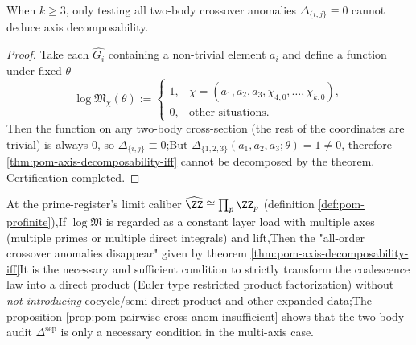\begin{proposition}\label{prop:pom-pairwise-cross-anom-insufficient}When \(k\ge 3\), only testing all two-body crossover anomalies \(\Delta_{\{i,j\}}\equiv 0\) cannot deduce axis decomposability.\end{proposition}
\begin{proof}
Take each \(\widehat{G_i}\) containing a non-trivial element \(a_i\) and define a function under fixed \(\theta\)\[
\log\mathfrak{M}_{\chi}(\theta):=
\begin{cases}
1, & \chi=(a_1,a_2,a_3,\chi_{4,0},\dots,\chi_{k,0}),\\
0, & \text{other situations}.\end{cases}
\]
Then the function on any two-body cross-section (the rest of the coordinates are trivial) is always \(0\), so \(\Delta_{\{i,j\}}\equiv 0\);But \(\Delta_{\{1,2,3\}}(a_1,a_2,a_3;\theta)=1\neq 0\), therefore \ref{thm:pom-axis-decomposability-iff} cannot be decomposed by the theorem. Certification completed.\end{proof}

\begin{remark}  \label{rem:pom-higher-cross-anom-euler}At the prime-register's limit caliber \(\widehat{\ZZ}\cong\prod_p\ZZ_p\) (definition \ref{def:pom-profinite}),If \(\log\mathfrak{M}\) is regarded as a constant layer load with multiple axes (multiple primes or multiple direct integrals) and lift,Then the "all-order crossover anomalies disappear" given by theorem \ref{thm:pom-axis-decomposability-iff}It is the necessary and sufficient condition to strictly transform the coalescence law into a direct product (Euler type restricted product factorization) without \emph{not introducing} cocycle/semi-direct product and other expanded data;The proposition \ref{prop:pom-pairwise-cross-anom-insufficient} shows that the two-body audit \(\Delta^{\mathrm{sep}}\) is only a necessary condition in the multi-axis case.\end{remark}

